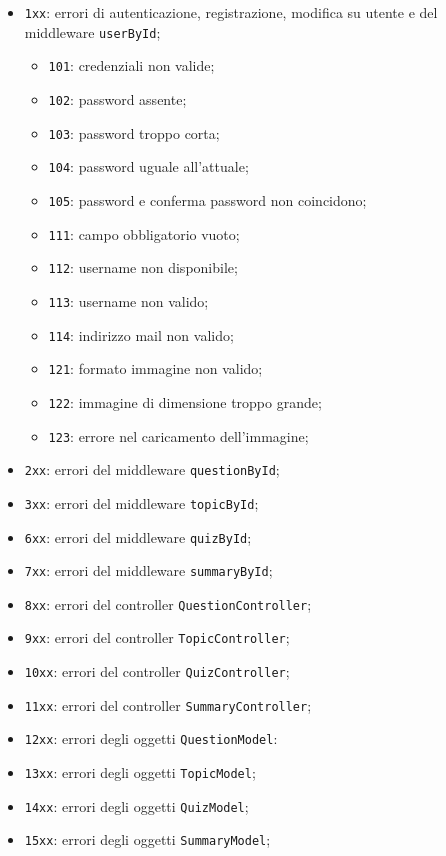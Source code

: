 \begin{itemize}
	\item \texttt{1xx}: errori di autenticazione, registrazione, modifica su utente e del middleware \texttt{userById};
		\begin{itemize}
			\item \texttt{101}: credenziali non valide;
			\item \texttt{102}: password assente;
			\item \texttt{103}: password troppo corta;
			\item \texttt{104}: password uguale all'attuale;
			\item \texttt{105}: password e conferma password non coincidono;
			\item \texttt{111}: campo obbligatorio vuoto;
			\item \texttt{112}: username non disponibile;
			\item \texttt{113}: username non valido;
			\item \texttt{114}: indirizzo mail non valido;
			\item \texttt{121}: formato immagine non valido;
			\item \texttt{122}: immagine di dimensione troppo grande;
			\item \texttt{123}: errore nel caricamento dell'immagine;
		\end{itemize}
	\item \texttt{2xx}: errori del middleware \texttt{questionById};
	\item \texttt{3xx}: errori del middleware \texttt{topicById};
	\item \texttt{6xx}: errori del middleware \texttt{quizById};
	\item \texttt{7xx}: errori del middleware \texttt{summaryById};
	\item \texttt{8xx}: errori del controller \texttt{QuestionController};
	\item \texttt{9xx}: errori del controller \texttt{TopicController};
	\item \texttt{10xx}: errori del controller \texttt{QuizController};
	\item \texttt{11xx}: errori del controller \texttt{SummaryController};
	\item \texttt{12xx}: errori degli oggetti \texttt{QuestionModel}:
	\item \texttt{13xx}: errori degli oggetti \texttt{TopicModel};
	\item \texttt{14xx}: errori degli oggetti \texttt{QuizModel};
	\item \texttt{15xx}: errori degli oggetti \texttt{SummaryModel};
\end{itemize}

